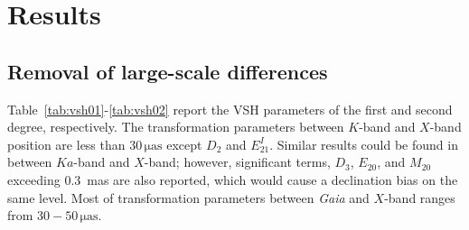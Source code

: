 \documentclass{aa-note}   %
\begin{document}


\section{Results}    \label{sec:result}

\subsection{Removal of large-scale differences}    \label{subsec:remove-sys}

Table~\ref{tab:vsh01}-\ref{tab:vsh02} report the VSH parameters of the first and second degree, respectively.
The transformation parameters between $K$-band and $X$-band position are less than $30\,\mathrm{\mu as}$ except $D_2$ and $E_{21}^I$.
Similar results could be found in between $Ka$-band and $X$-band; however, significant terms, $D_3$, $E_{20}$, and $M_{20}$ exceeding 0.3~mas are also reported, which would cause a declination bias on the same level.
Most of transformation parameters between \textit{Gaia} and $X$-band ranges from $30-50\,\mathrm{\mu as}$.
\end{document}
